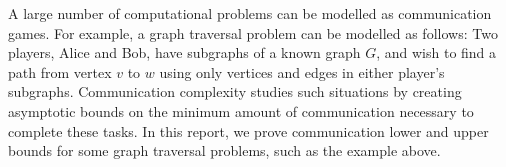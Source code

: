 A large number of computational problems can be modelled as communication games. For example, a graph traversal problem can be modelled as follows: Two players, Alice and Bob, have subgraphs of a known graph $G$, and wish to find a path from vertex $v$ to $w$ using only vertices and edges in either player's subgraphs. Communication complexity studies such situations by creating asymptotic bounds on the minimum amount of communication necessary to complete these tasks. In this report, we prove communication lower and upper bounds for some graph traversal problems, such as the example above.